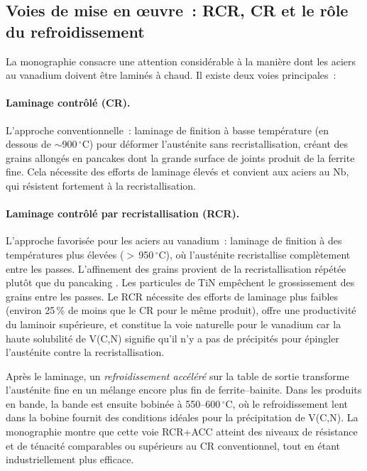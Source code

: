 \documentclass[11pt,a4paper]{article}
\begin{document}
\subsection{Voies de mise en \oe uvre~: RCR, CR et le r\^ole du
  refroidissement}

La monographie consacre une attention consid\'erable \`a la mani\`ere
dont les aciers au vanadium doivent \^etre lamin\'es \`a chaud.  Il
existe deux voies principales~:

\paragraph{Laminage contr\^ol\'e (CR).} L'approche conventionnelle~:
laminage de finition \`a basse temp\'erature (en dessous de
$\sim$900\,${}^\circ$C) pour d\'eformer l'aust\'enite sans
recristallisation, cr\'eant des grains allong\'es en \og pancakes \fg{}
dont la grande surface de joints produit de la ferrite fine.  Cela
n\'ecessite des efforts de laminage \'elev\'es et convient aux aciers au
Nb, qui r\'esistent fortement \`a la recristallisation.

\paragraph{Laminage contr\^ol\'e par recristallisation (RCR).}
L'approche favoris\'ee pour les aciers au vanadium~: laminage de
finition \`a des temp\'eratures plus \'elev\'ees
($>$\,950\,${}^\circ$C), o\`u l'aust\'enite recristallise compl\`etement
entre les passes.  L'affinement des grains provient de la
recristallisation r\'ep\'et\'ee plut\^ot que du \og pancaking \fg{}.
Les particules de TiN emp\^echent le grossissement des grains entre les
passes.  Le RCR n\'ecessite des efforts de laminage plus faibles
(environ 25\,\% de moins que le CR pour le m\^eme produit), offre une
productivit\'e du laminoir sup\'erieure, et constitue la voie naturelle
pour le vanadium car la haute solubilit\'e de V(C,N) signifie qu'il n'y
a pas de pr\'ecipit\'es pour \'epingler l'aust\'enite contre la
recristallisation.

Apr\`es le laminage, un \emph{refroidissement acc\'el\'er\'e} sur la
table de sortie transforme l'aust\'enite fine en un m\'elange encore plus
fin de ferrite--bainite.  Dans les produits en bande, la bande est
ensuite bobin\'ee \`a 550--600\,${}^\circ$C, o\`u le refroidissement lent
dans la bobine fournit des conditions id\'eales pour la pr\'ecipitation
de V(C,N).  La monographie montre que cette voie RCR+ACC atteint des
niveaux de r\'esistance et de t\'enacit\'e comparables ou sup\'erieurs au
CR conventionnel, tout en \'etant industriellement plus efficace.
\end{document}
